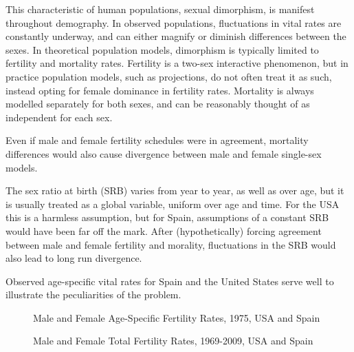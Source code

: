 
This characteristic of human populations, sexual dimorphism,
is manifest throughout demography. In observed populations,
fluctuations in vital rates are constantly underway, and can either magnify or
diminish differences between the sexes. In theoretical population models,
dimorphism is typically limited to fertility and mortality rates. Fertility 
is a two-sex interactive phenomenon, but in practice 
population models, such as projections, do not often treat it as
such, instead opting for female dominance in fertility rates. Mortality is
always modelled separately for both sexes, and can be reasonably thought of 
as independent for each sex. 

Even if male and female
fertility schedules were in agreement, mortality differences would also
cause divergence between male and female single-sex models. 

The sex ratio at
birth (SRB) varies from year to year, as well as over age, but it is usually
treated as a global variable, uniform over age and time. For the USA this is 
a harmless assumption, but for Spain, 
assumptions of a constant SRB would have been far off the mark. After
(hypothetically) forcing agreement between male and female fertility and
morality, fluctuations in the SRB would also lead to long run divergence.



Observed age-specific vital rates for Spain and the United States serve 
well to illustrate the peculiarities of the problem.  %

\begin{figure}[ht!]
        \centering  
          \caption{Male and Female Age-Specific Fertility Rates, 1975, USA and
          Spain}
          \label{fig:ASFR1975}
\end{figure}


\begin{figure}[ht!]
        \centering  
          \caption{Male and Female Total Fertility Rates, 1969-2009, USA and
          Spain}
          \label{fig:TFRseries}
\end{figure}

